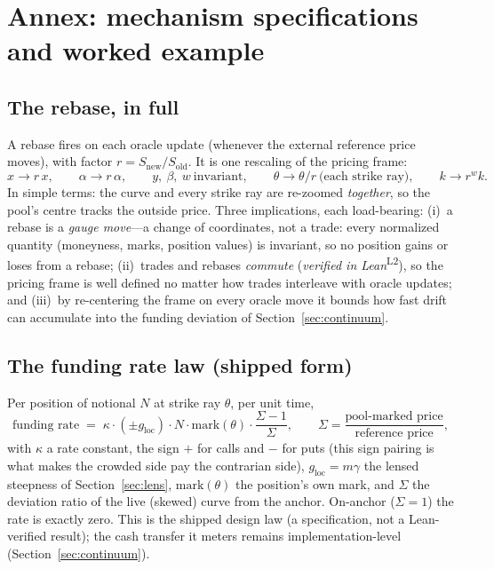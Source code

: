\documentclass[runningheads]{llncs}
\newcommand{\tfp}{\emph{verified in Lean}}
\begin{document}

\section{Annex: mechanism specifications and worked example}\label{app:spec}

\subsection{The rebase, in full}
A rebase fires on each oracle update (whenever the external reference price
moves), with factor $r=S_{\mathrm{new}}/S_{\mathrm{old}}$. It is one rescaling
of the pricing frame:
\[
  x\to r\,x,\qquad \alpha\to r\,\alpha,\qquad
  y,\ \beta,\ w\ \text{invariant},\qquad
  \theta\to\theta/r\ \text{(each strike ray)},\qquad k\to r^{w}k .
\]
In simple terms: the curve and every strike ray are re-zoomed \emph{together},
so the pool's centre tracks the outside price. Three implications, each
load-bearing: (i)~a rebase is a \emph{gauge move}---a change of coordinates,
not a trade: every normalized quantity (moneyness, marks, position values) is
invariant, so no position gains or loses from a rebase; (ii)~trades and rebases
\emph{commute} (\tfp{}\textsuperscript{L2}), so the pricing
frame is well defined no matter how trades interleave with oracle updates; and
(iii)~by re-centering the frame on every oracle move it bounds how fast drift
can accumulate into the funding deviation of Section~\ref{sec:continuum}.

\subsection{The funding rate law (shipped form)}
Per position of notional $N$ at strike ray $\theta$, per unit time,
\[
  \text{funding rate}
  \;=\;
  \kappa\cdot(\pm g_{\mathrm{loc}})\cdot N\cdot
  \mathrm{mark}(\theta)\cdot\frac{\Sigma-1}{\Sigma},
  \qquad
  \Sigma=\frac{\text{pool-marked price}}{\text{reference price}},
\]
with $\kappa$ a rate constant, the sign $+$ for calls and $-$ for puts (this
sign pairing is what makes the crowded side pay the contrarian side),
$g_{\mathrm{loc}}=m\gamma$ the lensed steepness of Section~\ref{sec:lens},
$\mathrm{mark}(\theta)$ the position's own mark, and $\Sigma$ the deviation
ratio of the live (skewed) curve from the anchor. On-anchor ($\Sigma=1$) the
rate is exactly zero. This is the shipped design law (a specification, not a
Lean-verified result); the cash transfer it meters remains
implementation-level (Section~\ref{sec:continuum}).
\end{document}
